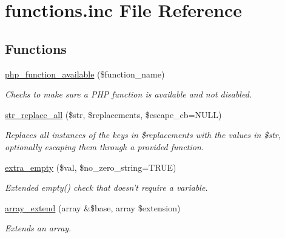 \hypertarget{functions_8inc}{\section{functions.\-inc File Reference}
\label{functions_8inc}
}
\subsection*{Functions}
\begin{DoxyCompactItemize}
\item 
\hyperlink{functions_8inc_af046064a94a452746f8ee2d5417066ec}{php\-\_\-function\-\_\-available} (\$function\-\_\-name)
\begin{DoxyCompactList}\small\item\em Checks to make sure a P\-H\-P function is available and not disabled. \end{DoxyCompactList}\item 
\hyperlink{functions_8inc_a204c6a85390da62a3ce99a791c865a9b}{str\-\_\-replace\-\_\-all} (\$str, \$replacements, \$escape\-\_\-cb=N\-U\-L\-L)
\begin{DoxyCompactList}\small\item\em Replaces all instances of the keys in \$replacements with the values in \$str, optionally escaping them through a provided function. \end{DoxyCompactList}\item 
\hyperlink{functions_8inc_a3cce2993eccf4627f7d607d62f63df60}{extra\-\_\-empty} (\$val, \$no\-\_\-zero\-\_\-string=T\-R\-U\-E)
\begin{DoxyCompactList}\small\item\em Extended empty() check that doesn't require a variable. \end{DoxyCompactList}\item 
\hyperlink{functions_8inc_a7232b02d8ee62e9d1f6e57573b6c1df6}{array\-\_\-extend} (array \&\$base, array \$extension)
\begin{DoxyCompactList}\small\item\em Extends an array. \end{DoxyCompactList}\end{DoxyCompactItemize}


